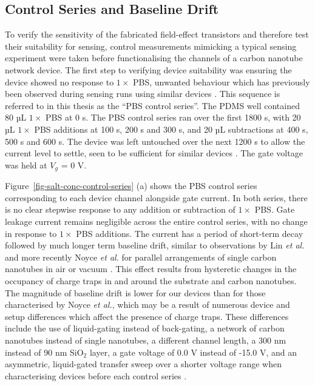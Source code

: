 \documentclass[
  a4paper,
]{scrbook}
\begin{document}
\hypertarget{sec-baseline-drift}{%
\subsection{Control Series and Baseline
Drift}\label{sec-baseline-drift}}

To verify the sensitivity of the fabricated field-effect transistors and
therefore test their suitability for sensing, control measurements
mimicking a typical sensing experiment were taken before functionalising
the channels of a carbon nanotube network device. The first step to
verifying device suitability was ensuring the device showed no response
to \(1 \times\) PBS, unwanted behaviour which has previously been
observed during sensing runs using similar devices
\autocite{Cassie2023}. This sequence is referred to in this thesis as
the ``PBS control series''. The PDMS well contained 80 µL \(1 \times\)
PBS at 0 s. The PBS control series ran over the first 1800 s, with 20 µL
\(1 \times\) PBS additions at 100 s, 200 s and 300 s, and 20 µL
subtractions at 400 s, 500 s and 600 s. The device was left untouched
over the next 1200 s to allow the current level to settle, seen to be
sufficient for similar devices \autocite{Cassie2023}. The gate voltage
was held at \(V_g\) = 0 V.

Figure~\ref{fig-salt-conc-control-series} (a) shows the PBS control
series corresponding to each device channel alongside gate current. In
both series, there is no clear stepwise response to any addition or
subtraction of \(1 \times\) PBS. Gate leakage current remains negligible
across the entire control series, with no change in response to
\(1 \times\) PBS additions. The current has a period of short-term decay
followed by much longer term baseline drift, similar to observations by
Lin \emph{et al.} and more recently Noyce \emph{et al.} for parallel
arrangements of single carbon nanotubes in air or vacuum
\autocite{Lin2006,Noyce2019}. This effect results from hysteretic
changes in the occupancy of charge traps in and around the substrate and
carbon nanotubes. The magnitude of baseline drift is lower for our
devices than for those characterised by Noyce \emph{et al.}, which may
be a result of numerous device and setup differences which affect the
presence of charge traps. These differences include the use of
liquid-gating instead of back-gating, a network of carbon nanotubes
instead of single nanotubes, a different channel length, a 300 nm
instead of 90 nm SiO\(_2\) layer, a gate voltage of 0.0 V instead of
-15.0 V, and an asymmetric, liquid-gated transfer sweep over a shorter
voltage range when characterising devices before each control series
\autocite{Noyce2019}.
\end{document}
